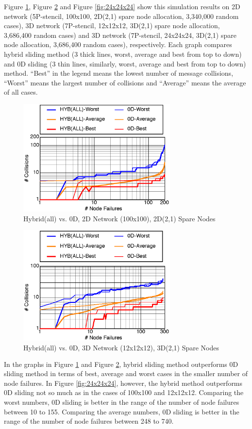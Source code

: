 \documentclass[Afour,times,sageh]{sagej}
\begin{document}
Figure \ref{fig:100x100}, Figure \ref{fig:12x12x12} and
Figure \ref{fig:24x24x24} show this simulation results on 2D network
(5P-stencil, 100x100, 2D(2,1) spare node allocation, 3,340,000 random
cases), 3D network (7P-stencil, 12x12x12, 3D(2,1) spare node
allocation, 3,686,400 random cases) and 3D network (7P-stencil,
24x24x24, 3D(2,1) spare node allocation, 3,686,400 random cases),
respectively. Each graph compares hybrid sliding method (3 thick
lines, worst, average and best from top to down) and 0D
sliding (3 thin lines, similarly, worst, average and best
from top to down) method. ``Best'' in the legend means the lowest
number of message collisions, ``Worst'' means the largest number of
collisions and ``Average'' means the average of all cases.

\begin{figure}[ht]
\centering
\includegraphics[width=80mm]{Figs/100x100-CL.eps}
  \caption{Hybrid(all) vs. 0D, 2D Network (100x100), 2D(2,1) Spare Nodes}
  \label{fig:100x100}
\end{figure}

\begin{figure}[ht]
\centering
\includegraphics[width=80mm]{Figs/12x12x12-CL.eps}
  \caption{Hybrid(all) vs. 0D, 3D Network (12x12x12), 3D(2,1) Spare Nodes}
  \label{fig:12x12x12}
\end{figure}

In the graphs in Figure \ref{fig:100x100} and Figure
\ref{fig:12x12x12}, hybrid sliding method outperforms 0D sliding
method in terms of best, average and worst cases in the smaller number
of node failures.
In Figure \ref{fig:24x24x24}, however, the hybrid method outperforms 0D
sliding not so much as in the cases of 100x100 and 12x12x12. Comparing
the worst numbers, 0D sliding is better in the range of the number of
node failures between 10 to 155. Comparing the
average numbers, 0D sliding is better in the range of the number of
node failures between 248 to 740.
\end{document}
